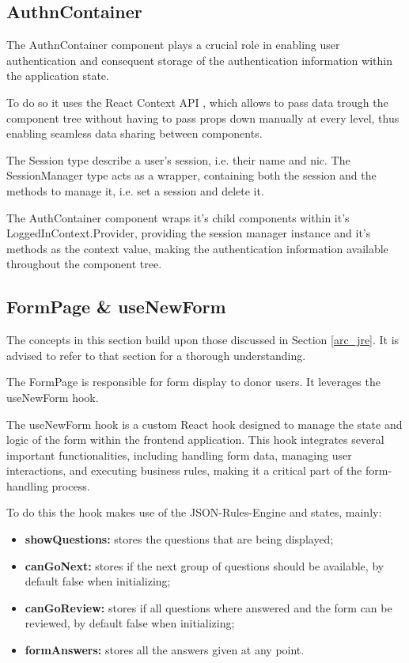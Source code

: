 \subsection{AuthnContainer}\label{authcontainer}
The AuthnContainer component plays a crucial role in enabling user authentication and consequent storage of the authentication information within the application state.

To do so it uses the React Context API \cite{React_Context_API}, which allows to pass data trough the component tree without having to pass props down manually at every level, thus enabling seamless data sharing between components.

The Session type describe a user's session, i.e. their name and nic. The SessionManager type acts as a wrapper, containing both the session and the methods to manage it, i.e. set a session and delete it.

The AuthContainer component wraps it's child components within it's LoggedInContext.Provider, providing the session manager instance and it's methods as the context value, making the authentication information available throughout the component tree.

\newpage
\subsection{FormPage \& useNewForm}\label{form_implementation}

The concepts in this section build upon those discussed in Section \ref{arc_jre}. It is advised to refer to that section for a thorough understanding.

The FormPage is responsible for form display to donor users. It leverages the useNewForm hook.

The useNewForm hook is a custom React hook designed to manage the state and logic of the form within the frontend application. This hook integrates several important functionalities, including handling form data, managing user interactions, and executing business rules, making it a critical part of the form-handling process.

To do this the hook makes use of the JSON-Rules-Engine \cite{JSON-Rules-Engine} and states, mainly: 
\begin{itemize}
	\item \textbf{showQuestions:} stores the questions that are being displayed;
	\item \textbf{canGoNext:} stores if the next group of questions should be available,  by default false when initializing;
	\item \textbf{canGoReview:} stores if all questions where answered and the form can be reviewed, by default false when initializing;
	\item \textbf{formAnswers:} stores all the answers given at any point.
\end{itemize}

